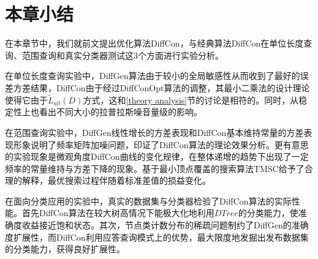 \section{本章小结}

在本章节中，我们就前文提出优化算法DiffCon，与经典算法DiffCon在单位长度查询、范围查询和真实分类器测试这3个方面进行实验分析。

在单位长度查询实验中，DiffGen算法由于较小的全局敏感性从而收到了最好的误差方差结果，DiffCon由于经过DiffConOpt算法的调整，其最小二乘法的设计理论使得它由于$\tilde{L}_{all}(D)$方式，这和\ref{theory analysis}节的讨论是相符的。同时，从稳定性上也看出不同大小的拉普拉斯噪音量级的影响。

在范围查询实验中，DiffGen线性增长的方差表现和DiffCon基本维持常量的方差表现形象说明了频率矩阵加噪问题，印证了DiffCon算法的理论效果分析。更有意思的实验现象是微观角度DiffCon曲线的变化规律，在整体递增的趋势下出现了一定频率的常量维持与方差下降的现象。基于最小顶点覆盖的搜索算法TMSC给予了合理的解释，最优搜索过程伴随着标准差值的损益变化。

在面向分类应用的实验中，真实的数据集与分类器检验了DiffCon算法的实际性能。首先DiffCon算法在较大树高情况下能极大化地利用$DTree$的分类能力，使准确度收益接近饱和状态。其次，节点类计数分布的稀疏问题制约了DiffGen的准确度扩展性，而DiffCon利用应答查询模式上的优势，最大限度地发掘出发布数据集的分类能力，获得良好扩展性。
